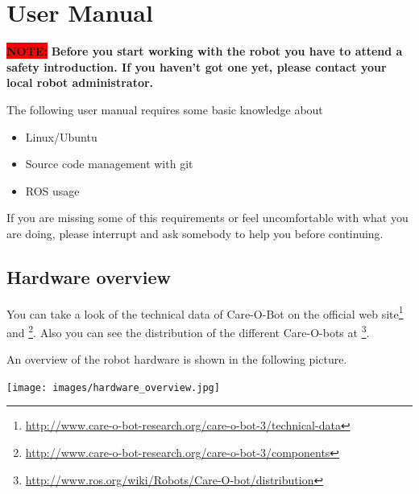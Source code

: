 \chapter{User Manual}
\label{chap:user}    

{\colorbox{red}{\textbf{NOTE:}}}\textbf{ Before you start working with the robot you have to attend a safety introduction. If you haven't got one yet, please contact your local robot administrator.}

The following user manual requires some basic knowledge about
\begin{itemize}
\item Linux/Ubuntu
\item Source code management with git
\item ROS usage
\end{itemize}
If you are missing some of this requirements or feel uncomfortable with what you are doing, please interrupt and ask somebody to help you before continuing.

\section{Hardware overview}
You can take a look of the technical data of Care-O-Bot on the official web site\footnote{\url{http://www.care-o-bot-research.org/care-o-bot-3/technical-data}} and \footnote{\url{http://www.care-o-bot-research.org/care-o-bot-3/components}}. Also you can see the distribution of the different Care-O-bots at \footnote{\url{http://www.ros.org/wiki/Robots/Care-O-bot/distribution}}.

An overview of the robot hardware is shown in the following picture.
\begin{center}
 \texttt{[image: images/hardware\_overview.jpg]}
\end{center}

